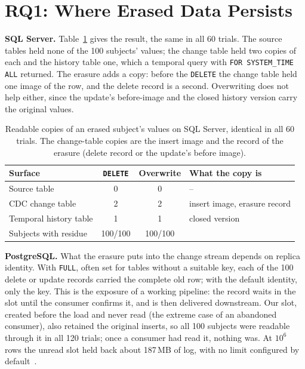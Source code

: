 \documentclass[runningheads]{llncs}
\begin{document}
\section{RQ1: Where Erased Data Persists}\label{sec:rq1}

\textbf{SQL Server.} Table~\ref{tab:residue} gives the result, the same in all
60 trials. The source tables held none of the 100 subjects' values; the change
table held two copies of each and the history table one, which a temporal query
with \texttt{FOR SYSTEM\_TIME ALL} returned. The erasure adds a copy: before the
\texttt{DELETE} the change table held one image of the row, and the delete
record is a second. Overwriting does not help either, since the update's
before-image and the closed history version carry the original values.

\begin{table}[t]
\caption{Readable copies of an erased subject's values on SQL Server, identical
in all 60 trials. The change-table copies are the insert image and the record
of the erasure (delete record or the update's before image).}\label{tab:residue}
\centering
\small
\begin{tabular}{lccl}
\toprule
Surface & \texttt{DELETE} & Overwrite & What the copy is \\
\midrule
Source table & 0 & 0 & -- \\
CDC change table & 2 & 2 & insert image, erasure record \\
Temporal history table & 1 & 1 & closed version \\
\midrule
Subjects with residue & 100/100 & 100/100 & \\
\bottomrule
\end{tabular}
\end{table}

\textbf{PostgreSQL.} What the erasure puts into the change stream depends on
replica identity. With \texttt{FULL}, often set for tables without a suitable
key, each of the 100 delete or update records carried the complete old row;
with the default identity, only the key. This is the exposure of a working
pipeline: the record waits in the slot until the consumer confirms it, and is
then delivered downstream. Our slot, created before the load and never read
(the extreme case of an abandoned consumer), also retained the original inserts,
so all 100 subjects were readable through it in all 120 trials; once a consumer
had read it, nothing was. At $10^6$ rows the unread slot held
back about 187\,MB of log, with no limit configured by default~\cite{pgconfig}.
\end{document}
